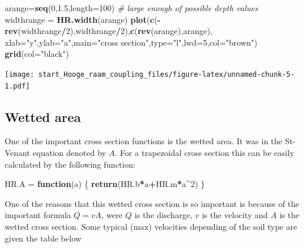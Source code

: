 \documentclass[
]{article}
\newenvironment{Shaded}{\begin{snugshade}}{\end{snugshade}}
\newcommand{\AttributeTok}[1]{\textcolor[rgb]{0.13,0.29,0.53}{#1}}
\newcommand{\CommentTok}[1]{\textcolor[rgb]{0.56,0.35,0.01}{\textit{#1}}}
\newcommand{\ControlFlowTok}[1]{\textcolor[rgb]{0.13,0.29,0.53}{\textbf{#1}}}
\newcommand{\DecValTok}[1]{\textcolor[rgb]{0.00,0.00,0.81}{#1}}
\newcommand{\FloatTok}[1]{\textcolor[rgb]{0.00,0.00,0.81}{#1}}
\newcommand{\FunctionTok}[1]{\textcolor[rgb]{0.13,0.29,0.53}{\textbf{#1}}}
\newcommand{\NormalTok}[1]{#1}
\newcommand{\OtherTok}[1]{\textcolor[rgb]{0.56,0.35,0.01}{#1}}
\newcommand{\SpecialCharTok}[1]{\textcolor[rgb]{0.81,0.36,0.00}{\textbf{#1}}}
\newcommand{\StringTok}[1]{\textcolor[rgb]{0.31,0.60,0.02}{#1}}
\begin{document}
\begin{Shaded}
\begin{Highlighting}[]
\NormalTok{arange}\OtherTok{=}\FunctionTok{seq}\NormalTok{(}\DecValTok{0}\NormalTok{,}\FloatTok{1.5}\NormalTok{,}\AttributeTok{length=}\DecValTok{100}\NormalTok{) }\CommentTok{\# large enough of possible depth values }
\NormalTok{widthrange }\OtherTok{=} \FunctionTok{HR.width}\NormalTok{(arange)}
\FunctionTok{plot}\NormalTok{(}\FunctionTok{c}\NormalTok{(}\SpecialCharTok{{-}}\FunctionTok{rev}\NormalTok{(widthrange}\SpecialCharTok{/}\DecValTok{2}\NormalTok{),widthrange}\SpecialCharTok{/}\DecValTok{2}\NormalTok{),}\FunctionTok{c}\NormalTok{(}\FunctionTok{rev}\NormalTok{(arange),arange),}
     \AttributeTok{xlab=}\StringTok{"y"}\NormalTok{,}\AttributeTok{ylab=}\StringTok{"a"}\NormalTok{,}\AttributeTok{main=}\StringTok{"cross section"}\NormalTok{,}\AttributeTok{type=}\StringTok{"l"}\NormalTok{,}\AttributeTok{lwd=}\DecValTok{5}\NormalTok{,}\AttributeTok{col=}\StringTok{"brown"}\NormalTok{)}
\FunctionTok{grid}\NormalTok{(}\AttributeTok{col=}\StringTok{"black"}\NormalTok{)}
\end{Highlighting}
\end{Shaded}

\texttt{[image: start\_Hooge\_raam\_coupling\_files/figure-latex/unnamed-chunk-5-1.pdf]}

\hypertarget{wetted-area}{%
\subsection{Wetted area}\label{wetted-area}}

One of the important cross section functions is the wetted area. It was
in the St-Venant equation denoted by \(A\). For a trapezoidal cross
section this can be easily calculated by the following function:

\begin{Shaded}
\begin{Highlighting}[]
\NormalTok{HR.A }\OtherTok{=} \ControlFlowTok{function}\NormalTok{(a)}
\NormalTok{\{}
  \FunctionTok{return}\NormalTok{(HR.b}\SpecialCharTok{*}\NormalTok{a}\SpecialCharTok{+}\NormalTok{HR.m}\SpecialCharTok{*}\NormalTok{a}\SpecialCharTok{\^{}}\DecValTok{2}\NormalTok{)}
\NormalTok{\}}
\end{Highlighting}
\end{Shaded}

One of the reasons that this wetted cross section is so important is
because of the important formula \(Q = v A\), were \(Q\) is the
discharge, \(v\) is the velocity and \(A\) is the wetted cross section.
Some typical (max) velocities depending of the soil type are given the
table below
\end{document}
